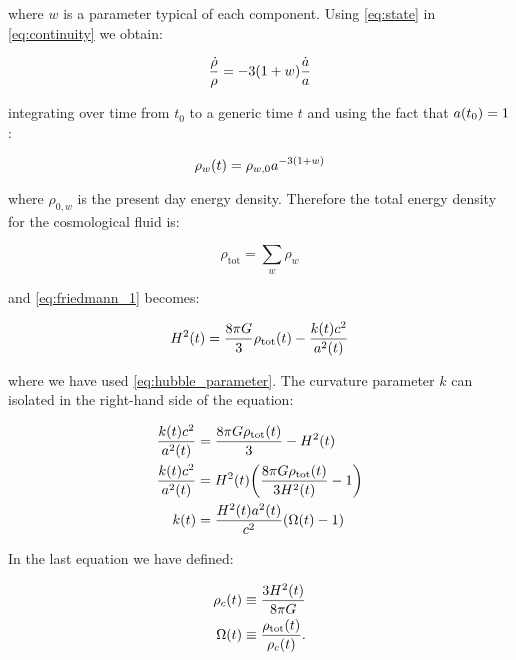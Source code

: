 where $w$ is a parameter typical of each component.
Using \autoref{eq:state} in \autoref{eq:continuity} we obtain:

\begin{equation}
        \frac{\dot \rho}{\rho} = -3\qty(1 + w) \frac{\dot a}{a}
\end{equation}

integrating over time from $t_0$ to a generic time $t$ and using the fact
that $a\qty(t_0) = 1$:

\begin{equation}
        \rho_w\qty(t) = \rho_{w,0} a^{-3\qty(1 + w)}
\end{equation}

where $\rho_{0,w}$ is the present day energy density.
Therefore the total energy density for the cosmological fluid is:

\begin{equation}
        \rho_{\text{tot}} = \sum_w \rho_w
\end{equation}

and \autoref{eq:friedmann_1} becomes:

\begin{equation}
        H^2\qty(t) = \frac{8\pi G}{3} \rho_{\text{tot}}\qty(t) -
        \frac{k\qty(t) c^2}{a^2\qty(t)}
\end{equation}

where we have used \autoref{eq:hubble_parameter}. The curvature parameter
$k$ can isolated in the right-hand side of the equation:

\begin{equation}
        \begin{split}
                \frac{k\qty(t) c^2}{a^2\qty(t)} & =
                \frac{8\pi G \rho_{\text{tot}}\qty(t)}{3} - H^2\qty(t) \\
                \frac{k\qty(t) c^2}{a^2\qty(t)} & =
                H^2\qty(t) \qty(\frac{8\pi G \rho_{\text{tot}}\qty(t)}{3H^2\qty(t)} - 1) \\
                k(t) & = \frac{H^2\qty(t) a^2\qty(t)}{c^2} \qty(\Omega\qty(t) - 1) \\
        \end{split}
        \label{eq:friedmann_curvature}
\end{equation}

In the last equation we have defined:

\begin{align}
        \rho_c\qty(t) & \equiv \frac{3H^2\qty(t)}{8\pi G} \\
        \Omega\qty(t) & \equiv \frac{\rho_{\text{tot}}\qty(t)}{\rho_c\qty(t)}.
\end{align}

